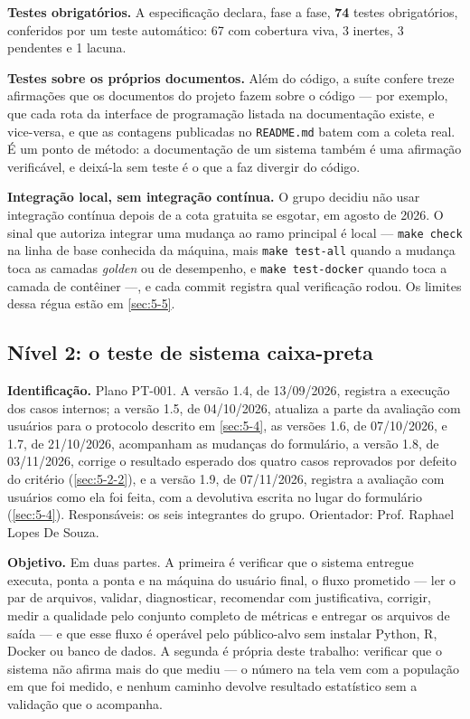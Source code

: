 \textbf{Testes obrigatórios.} A especificação declara, fase a fase, \textbf{74} testes obrigatórios, conferidos por um teste automático: 67 com cobertura viva, 3 inertes, 3 pendentes e 1 lacuna.


\textbf{Testes sobre os próprios documentos.} Além do código, a suíte confere treze afirmações que os documentos do projeto fazem sobre o código --- por exemplo, que cada rota da interface de programação listada na documentação existe, e vice-versa, e que as contagens publicadas no \texttt{README.\allowbreak{}md} batem com a coleta real. É um ponto de método: a documentação de um sistema também é uma afirmação verificável, e deixá-la sem teste é o que a faz divergir do código.


\textbf{Integração local, sem integração contínua.} O grupo decidiu não usar integração contínua depois de a cota gratuita se esgotar, em agosto de 2026. O sinal que autoriza integrar uma mudança ao ramo principal é local --- \texttt{make check} na linha de base conhecida da máquina, mais \texttt{make test-\allowbreak{}all} quando a mudança toca as camadas \textit{golden} ou de desempenho, e \texttt{make test-\allowbreak{}docker} quando toca a camada de contêiner ---, e cada commit registra qual verificação rodou. Os limites dessa régua estão em \ref{sec:5-5}.


\subsection{Nível 2: o teste de sistema caixa-preta}\label{sec:5-1-3}

\textbf{Identificação.} Plano PT-001. A versão 1.4, de 13/09/2026, registra a execução dos casos internos; a versão 1.5, de 04/10/2026, atualiza a parte da avaliação com usuários para o protocolo descrito em \ref{sec:5-4}, as versões 1.6, de 07/10/2026, e 1.7, de 21/10/2026, acompanham as mudanças do formulário, a versão 1.8, de 03/11/2026, corrige o resultado esperado dos quatro casos reprovados por defeito do critério (\ref{sec:5-2-2}), e a versão 1.9, de 07/11/2026, registra a avaliação com usuários como ela foi feita, com a devolutiva escrita no lugar do formulário (\ref{sec:5-4}). Responsáveis: os seis integrantes do grupo. Orientador: Prof. Raphael Lopes De Souza.

\textbf{Objetivo.} Em duas partes. A primeira é verificar que o sistema entregue executa, ponta a ponta e na máquina do usuário final, o fluxo prometido --- ler o par de arquivos, validar, diagnosticar, recomendar com justificativa, corrigir, medir a qualidade pelo conjunto completo de métricas e entregar os arquivos de saída --- e que esse fluxo é operável pelo público-alvo sem instalar Python, R, Docker ou banco de dados. A segunda é própria deste trabalho: verificar que o sistema não afirma mais do que mediu --- o número na tela vem com a população em que foi medido, e nenhum caminho devolve resultado estatístico sem a validação que o acompanha.

